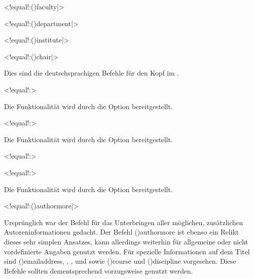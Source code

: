\begin{DeclareEntity}{}
\begin{NoIndexDefault}
\begin{Declaration}
  {}
  <!equal!:\Macro(){faculty|}>
\begin{Declaration}
  {}
  <!equal!:\Macro(){department|}>
\begin{Declaration}
  {}
  <!equal!:\Macro(){institute|}>
\begin{Declaration}
  {}
  <!equal!:\Macro(){chair|}>
\printdeclarationlist

Dies sind die deutschsprachigen Befehle für den Kopf im \CD.
\end{Declaration}
\end{Declaration}
\end{Declaration}
\end{Declaration}

\begin{Declaration}
  {}
  <!equal!:>
\printdeclarationlist

Die Funktionalität wird durch die Option  bereitgestellt.
\end{Declaration}

\begin{Declaration}
  {}
  <!equal!:>
\printdeclarationlist

Die Funktionalität wird durch die Option  bereitgestellt.
\end{Declaration}

\begin{Declaration}
  {}
  <!equal!:>
\begin{Declaration}
  {}
  <!equal!:>
\printdeclarationlist

Die Funktionalität wird durch die Option  bereitgestellt.
\end{Declaration}
\end{Declaration}

\begin{Declaration}
  {}
  <!equal!:\Macro(){authormore|}>
\printdeclarationlist

Ursprünglich war der Befehl für das Unterbringen aller möglichen, zusätzlichen 
Autoreninformationen gedacht. Der Befehl \Macro(){authormore} 
ist ebenso ein Relikt dieses sehr simplen Ansatzes, kann allerdings weiterhin 
für allgemeine oder nicht vordefinierte Angaben genutzt werden. Für spezielle 
Informationen auf dem Titel sind \Macro(){emailaddress}, 
, ,  
und  sowie \Macro(){course} und 
\Macro(){discipline} vorgesehen. Diese Befehle sollten 
dementsprechend vorzugsweise genutzt werden.
\end{Declaration}


\end{NoIndexDefault}
\end{DeclareEntity}
